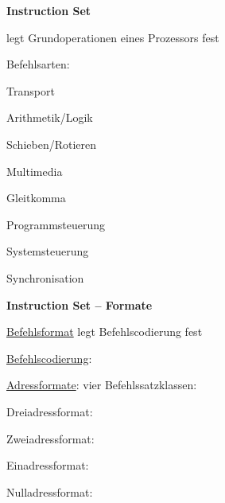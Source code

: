 \textbf{Instruction Set}
\begin{items}
	\item legt Grundoperationen eines Prozessors fest
	\item Befehlsarten:
	\begin{enumeration}
		\item Transport
		\item Arithmetik/Logik
		\item Schieben/Rotieren
		\item Multimedia
		\item Gleitkomma
		\item Programmsteuerung
		\item Systemsteuerung
		\item Synchronisation
	\end{enumeration}
\end{items}

\textbf{Instruction Set -- Formate}
\begin{items}
	\item \underline{Befehlsformat} legt Befehlscodierung fest
	\item \underline{Befehlscodierung}: 
	\item \underline{Adressformate}: vier Befehlssatzklassen:
	\begin{enumeration}
		\item Dreiadressformat: \code{[opcode] [dest] [src1] [src2]}
		\item Zweiadressformat: 
		\item Einadressformat: \code{[opcode] [src]}
		\item Nulladressformat: \code{[opcode]}
	\end{enumeration}
\end{items}

